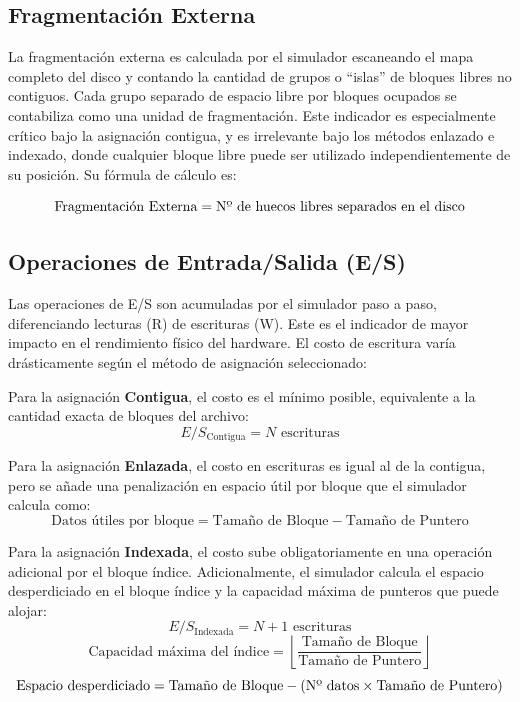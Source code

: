 \documentclass[12pt,a4paper]{article}
\begin{document}
\subsection{Fragmentación Externa}

La fragmentación externa es calculada por el simulador escaneando el mapa completo del disco y contando la cantidad de grupos o ``islas'' de bloques libres no contiguos. Cada grupo separado de espacio libre por bloques ocupados se contabiliza como una unidad de fragmentación. Este indicador es especialmente crítico bajo la asignación contigua, y es irrelevante bajo los métodos enlazado e indexado, donde cualquier bloque libre puede ser utilizado independientemente de su posición. Su fórmula de cálculo es:

\[
\text{Fragmentación Externa} = \text{N\textordmasculine{} de huecos libres separados en el disco}
\]

\subsection{Operaciones de Entrada/Salida (E/S)}

Las operaciones de E/S son acumuladas por el simulador paso a paso, diferenciando lecturas (R) de escrituras (W). Este es el indicador de mayor impacto en el rendimiento físico del hardware. El costo de escritura varía drásticamente según el método de asignación seleccionado:

Para la asignación \textbf{Contigua}, el costo es el mínimo posible, equivalente a la cantidad exacta de bloques del archivo:
\[
E/S_{\text{Contigua}} = N \text{ escrituras}
\]

Para la asignación \textbf{Enlazada}, el costo en escrituras es igual al de la contigua, pero se añade una penalización en espacio útil por bloque que el simulador calcula como:
\[
\text{Datos útiles por bloque} = \text{Tamaño de Bloque} - \text{Tamaño de Puntero}
\]

Para la asignación \textbf{Indexada}, el costo sube obligatoriamente en una operación adicional por el bloque índice. Adicionalmente, el simulador calcula el espacio desperdiciado en el bloque índice y la capacidad máxima de punteros que puede alojar:
\[
E/S_{\text{Indexada}} = N + 1 \text{ escrituras}
\]
\[
\text{Capacidad máxima del índice} = \left\lfloor \frac{\text{Tamaño de Bloque}}{\text{Tamaño de Puntero}} \right\rfloor
\]
\[
\text{Espacio desperdiciado} = \text{Tamaño de Bloque} - (\text{N\textordmasculine{} datos} \times \text{Tamaño de Puntero})
\]
\end{document}
